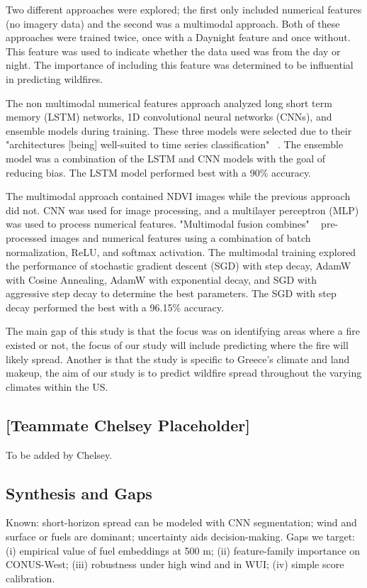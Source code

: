 \documentclass[conference]{IEEEtran}
\begin{document}
Two different approaches were explored; the first only included numerical features (no imagery data) and the second was a multimodal approach. Both of these approaches were trained twice, once with a Daynight feature and once without. This feature was used to indicate whether the data used was from the day or night. The importance of including this feature was determined to be influential in predicting wildfires. 

The non multimodal numerical features approach analyzed long short term memory (LSTM) networks, 1D convolutional neural networks (CNNs), and ensemble models during training. These three models were selected due to their "architectures [being] well-suited to time series classification" \ \cite{papakis2025AMultimodalEnsembleDeepLearning}. The ensemble model was a combination of the LSTM and CNN models with the goal of reducing bias. The LSTM model performed best with a 90\% accuracy. 

The multimodal approach contained NDVI images while the previous approach did not. CNN was used for image processing, and a multilayer perceptron (MLP) was used to process numerical features. "Multimodal fusion combines" \ \cite{papakis2025AMultimodalEnsembleDeepLearning} pre-processed images and numerical features using a combination of batch normalization, ReLU, and softmax activation. The multimodal training explored the performance of stochastic gradient descent (SGD) with step decay, AdamW with Cosine Annealing, AdamW with exponential decay, and SGD with aggressive step decay to determine the best parameters. The SGD with step decay performed the best with a 96.15\% accuracy. 

The main gap of this study is that the focus was on identifying areas where a fire existed or not, the focus of our study will include predicting where the fire will likely spread. Another is that the study is specific to Greece's climate and land makeup, the aim of our study is to predict wildfire spread throughout the varying climates within the US. 

\subsection{[Teammate Chelsey Placeholder]}
To be added by Chelsey.

\subsection{Synthesis and Gaps}
Known: short-horizon spread can be modeled with CNN segmentation; wind and surface or fuels are dominant; uncertainty aids decision-making. Gaps we target: (i) empirical value of fuel embeddings at 500 m; (ii) feature-family importance on CONUS-West; (iii) robustness under high wind and in WUI; (iv) simple score calibration.
\end{document}
